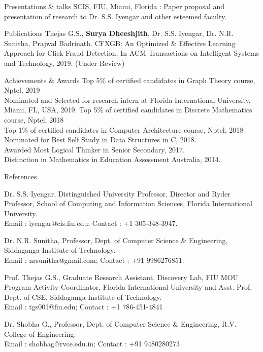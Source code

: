 \documentclass{resume} %
\begin{document}
\begin{rSection}{Presentations \& talks}
SCIS, FIU, Miami, Florida : Paper proposal and presentation of research to Dr. S.S. Iyengar and other esteemed faculty.
\end{rSection}

\begin{rSection}{Publications}
Thejas G.S., {\bf Surya Dheeshjith}, Dr. S.S. Iyengar, Dr. N.R. Sunitha, Prajwal Badrinath. CFXGB:
An Optimized \& Effective Learning Approach for Click Fraud Detection. In ACM Transactions on Intelligent Systems and Technology, 2019. (Under Review)
\end{rSection}

\begin{rSection}{Achievements \& Awards} 
Top 5\% of certified candidates in Graph Theory course, Nptel, 2019\\
Nominated and Selected for research intern at Florida International University, Miami, FL, USA, 2019.
Top 5\% of certified candidates in Discrete Mathematics course, Nptel, 2018\\
Top 1\% of certified candidates in Computer Architecture course, Nptel, 2018\\
Nominated for Best Self Study in Data Structures in C, 2018.\\
Awarded Most Logical Thinker in Senior Secondary, 2017.\\
Distinction in Mathematics in Education Assessment Australia, 2014.\\

\end{rSection}

\begin{rSection}{References} 
\item Dr. S.S. Iyengar, Distinguished University Professor, Director and Ryder Professor, School of Computing and Information Sciences, Florida International University. \\Email : iyengar@cis.fiu.edu; Contact : +1 305-348-3947.
\item Dr. N.R. Sunitha, Professor, Dept. of Computer Science \& Engineering, Siddaganga Institute of Technology.
\\Email : nrsunitha@gmail.com; Contact : +91 9986276851.
\item Prof. Thejas G.S., Graduate Research Assistant, Discovery 
Lab, FIU MOU Program Activity Coordinator, Florida International University and Asst. Prof, Dept. of CSE, Siddaganga Institute of Technology.\\ Email : tgs001@fiu.edu; Contact : +1 786-451-4841
\item Dr. Shobha G., Professor, Dept. of Computer Science \& Engineering, R.V. College of Engineering.\\
Email : shobhag@rvce.edu.in; Contact : +91 9480280273
\end{rSection}
\end{document}
